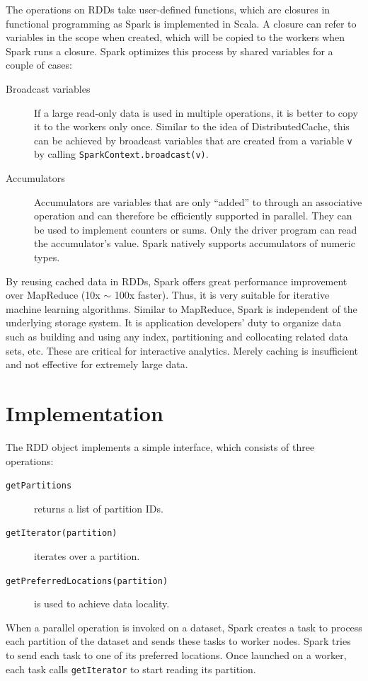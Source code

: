 \documentclass[11pt]{book}
\begin{document}
The operations on RDDs take user-defined functions, which are closures in functional programming as Spark is implemented in Scala. A closure can refer to variables in the scope when created, which will be copied to the workers when Spark runs a closure. Spark optimizes this process by shared variables for a couple of cases:
\begin{description}
\item[Broadcast variables]
If a large read-only data is used in multiple operations, it is better to copy it to the workers only once. Similar to the idea of DistributedCache, this can be achieved by broadcast variables that are created from a variable \texttt{v} by calling \texttt{SparkContext.broadcast(v)}.
\item[Accumulators]
Accumulators are variables that are only ``added'' to through an associative operation and can therefore be efficiently supported in parallel. They can be used to implement counters or sums. Only the driver program can read the accumulator's value. Spark natively supports accumulators of numeric types.
\end{description}
By reusing cached data in RDDs, Spark offers great performance improvement over MapReduce (10x $\sim$ 100x faster). Thus, it is very suitable for iterative machine learning algorithms.
Similar to MapReduce, Spark is independent of the underlying storage system. It is application developers' duty to organize data such as building and using any index, partitioning and collocating related data sets, etc. These are critical for interactive analytics. Merely caching is insufficient and not effective for extremely large data.

\section{Implementation}
The RDD object implements a simple interface, which consists of three operations:
\begin{description}
\item[\texttt{getPartitions}] returns a list of partition IDs.
\item[\texttt{getIterator(partition)}] iterates over a partition.
\item[\texttt{getPreferredLocations(partition)}] is used to achieve data locality.
\end{description}
When a parallel operation is invoked on a dataset, Spark creates a task to process each partition of the dataset and sends these tasks to worker nodes. Spark tries to send each task to one of its preferred locations. Once launched on a worker, each task calls \texttt{getIterator} to start reading its partition.
\end{document}
